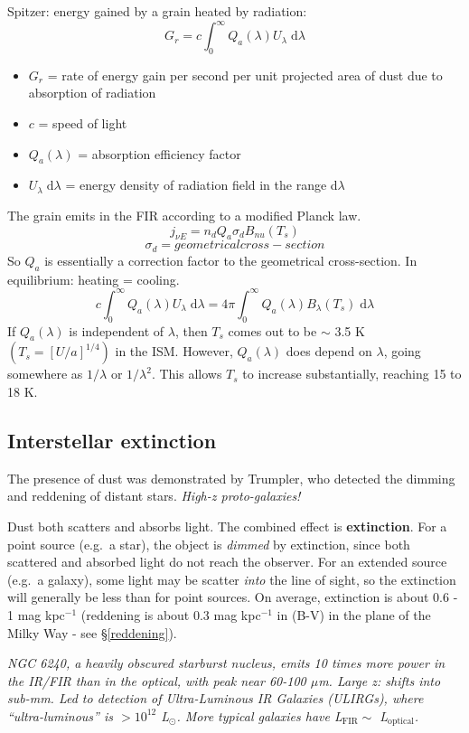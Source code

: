 \documentclass[12pt]{article}
\newcommand{\mar}[1]{\hspace{0pt}\marginpar{-\textcolor{black}{#1}-}}
\newcommand{\mynotes}[1]{{\fontfamily{cmss}\selectfont \textit{#1}}}
\begin{document}
Spitzer: energy gained by a grain heated by radiation:
\[
    G_{r} = c \int_{0}^{\infty}{
        Q_{a} (\lambda) U_{\lambda}\; \mathrm{d}\lambda}
    \]
\begin{itemize}
    \item $G_{r}$ = rate of energy gain per second per unit projected
        area of dust due to absorption of radiation
    \item $c$ = speed of light
    \item $Q_{a}(\lambda)$ = absorption efficiency factor
    \item $U_{\lambda}\; \mathrm{d}\lambda$ = energy density of radiation
        field in the range d$\lambda$
\end{itemize}
The grain emits in the FIR according to a modified Planck law.
\[
    j_{{\nu}E} = n_{d} Q_{a} \sigma_{d} B_{nu} (T_{s})
    \]
\[
    \sigma_{d} = geometrical cross-section
    \]
So $Q_{a}$ is essentially a correction factor to the geometrical cross-section.
In equilibrium: heating = cooling.\mar{111}
\[
    c \int_{0}^{\infty}{
        Q_{a} (\lambda) U_{\lambda}\; \mathrm{d}\lambda }
    = 4\pi \int_{0}^{\infty}{
        Q_{a} (\lambda) B_{\lambda} (T_{s})\; \mathrm{d}\lambda }
    \]
If $Q_{a}(\lambda)$ is independent of $\lambda$, then $T_{s}$ comes out
to be $\sim$ 3.5 K $ (T_{s} = [U/a]^{1/4} ) $ in the ISM.
However, $Q_{a}(\lambda)$ does depend on $\lambda$, going somewhere
as $1/\lambda$ or $1/\lambda^{2}$. This allows $T_{s}$ to increase
substantially, reaching 15 to 18 K.

\subsection{Interstellar extinction}
\mar{116}The presence of dust was demonstrated by Trumpler, who detected the
dimming and reddening of distant stars. \mynotes{High-z proto-galaxies!}

Dust both scatters and absorbs light. The combined effect is
\textbf{extinction}. For a point source (e.g.\ a star), the object is
\emph{dimmed} by extinction, since both scattered and absorbed light do not
reach the observer. For an extended source (e.g.\ a galaxy), some light may be
scatter \emph{into} the line of sight, so the extinction will generally be less
than for point sources. On average, extinction is about 0.6 - 1 mag kpc$^{-1}$
(reddening is about 0.3 mag kpc$^{-1}$ in (B-V) in the plane of the Milky Way -
see \S{}\ref{reddening}).

\mynotes{NGC 6240, a heavily obscured starburst nucleus, emits 10 times more
power in the IR/FIR than in the optical, with peak near 60-100 $\mu$m.
Large z: shifts into sub-mm. Led to detection of Ultra-Luminous
IR Galaxies (ULIRGs), where ``ultra-luminous'' is $> 10^{12}$ L$_{\odot}$.
More typical galaxies have L$_{\mathrm{FIR}} \sim$ L$_{\mathrm{optical}}$.}
\end{document}
